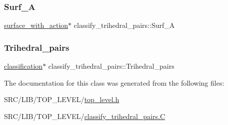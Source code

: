 \subsubsection{\texorpdfstring{Surf\+\_\+A}{Surf\_A}}
{\footnotesize\ttfamily \mbox{\hyperlink{classsurface__with__action}{surface\+\_\+with\+\_\+action}}$\ast$ classify\+\_\+trihedral\+\_\+pairs\+::\+Surf\+\_\+A}

\mbox{\label{classclassify__trihedral__pairs_a5908a2bdf051560d6b0990c07f1b2ceb}} 
\subsubsection{\texorpdfstring{Trihedral\+\_\+pairs}{Trihedral\_pairs}}
{\footnotesize\ttfamily \mbox{\hyperlink{classclassification}{classification}}$\ast$ classify\+\_\+trihedral\+\_\+pairs\+::\+Trihedral\+\_\+pairs}



The documentation for this class was generated from the following files\+:\begin{DoxyCompactItemize}
\item 
S\+R\+C/\+L\+I\+B/\+T\+O\+P\+\_\+\+L\+E\+V\+E\+L/\mbox{\hyperlink{top__level_8h}{top\+\_\+level.\+h}}\item 
S\+R\+C/\+L\+I\+B/\+T\+O\+P\+\_\+\+L\+E\+V\+E\+L/\mbox{\hyperlink{classify__trihedral__pairs_8_c}{classify\+\_\+trihedral\+\_\+pairs.\+C}}\end{DoxyCompactItemize}
